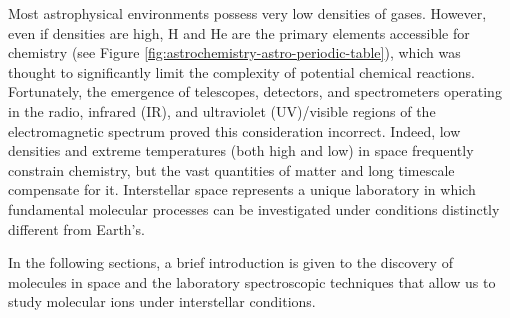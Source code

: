 Most astrophysical environments possess very low densities of gases. However, even if densities are high, H and He are 
the primary elements accessible for chemistry (see Figure \ref{fig:astrochemistry-astro-periodic-table}), which was 
thought to significantly limit the complexity of potential chemical reactions. Fortunately, the emergence of 
telescopes, detectors, and spectrometers operating in the radio, infrared (IR), and ultraviolet (UV)/visible regions of 
the electromagnetic spectrum proved this consideration incorrect. Indeed, low densities and extreme temperatures (both 
high and low) in space frequently constrain chemistry, but the vast quantities of matter and long timescale compensate 
for it. Interstellar space represents a unique laboratory in which fundamental molecular processes can be investigated 
under conditions distinctly different from Earth's.

In the following sections, a brief introduction is given to the discovery of molecules in space and the laboratory 
spectroscopic techniques that allow us to study molecular ions under interstellar conditions.
